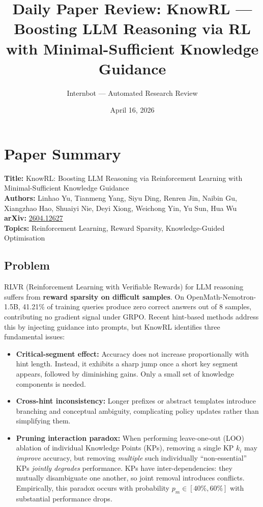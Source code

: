 \documentclass[11pt]{article}
\title{Daily Paper Review: KnowRL --- Boosting LLM Reasoning via RL\\with Minimal-Sufficient Knowledge Guidance}
\author{Internbot --- Automated Research Review}
\date{April 16, 2026}
\begin{document}
\maketitle

\section{Paper Summary}

\textbf{Title:} KnowRL: Boosting LLM Reasoning via Reinforcement Learning with Minimal-Sufficient Knowledge Guidance \\
\textbf{Authors:} Linhao Yu, Tianmeng Yang, Siyu Ding, Renren Jin, Naibin Gu, Xiangzhao Hao, Shuaiyi Nie, Deyi Xiong, Weichong Yin, Yu Sun, Hua Wu \\
\textbf{arXiv:} \href{https://arxiv.org/abs/2604.12627}{2604.12627} \\
\textbf{Topics:} Reinforcement Learning, Reward Sparsity, Knowledge-Guided Optimisation

\subsection{Problem}

RLVR (Reinforcement Learning with Verifiable Rewards) for LLM reasoning suffers from \textbf{reward sparsity on difficult samples}. On OpenMath-Nemotron-1.5B, 41.21\% of training queries produce zero correct answers out of 8 samples, contributing no gradient signal under GRPO. Recent hint-based methods address this by injecting guidance into prompts, but KnowRL identifies three fundamental issues:

\begin{itemize}
    \item \textbf{Critical-segment effect:} Accuracy does not increase proportionally with hint length. Instead, it exhibits a sharp jump once a short key segment appears, followed by diminishing gains. Only a small set of knowledge components is needed.

    \item \textbf{Cross-hint inconsistency:} Longer prefixes or abstract templates introduce branching and conceptual ambiguity, complicating policy updates rather than simplifying them.

    \item \textbf{Pruning interaction paradox:} When performing leave-one-out (LOO) ablation of individual Knowledge Points (KPs), removing a single KP $k_i$ may \textit{improve} accuracy, but removing \textit{multiple} such individually ``non-essential'' KPs \textit{jointly degrades} performance. KPs have inter-dependencies: they mutually disambiguate one another, so joint removal introduces conflicts. Empirically, this paradox occurs with probability $p_m \in [40\%, 60\%]$ with substantial performance drops.
\end{itemize}
\end{document}
